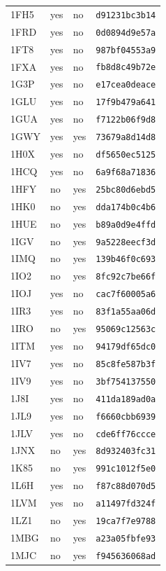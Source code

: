 \documentclass[11pt]{article}
\begin{document}
\begin{longtable}{llll}
1FH5 & yes & no & \texttt{d91231bc3b14}\\
1FRD & yes & no & \texttt{0d0894d9e57a}\\
1FT8 & yes & no & \texttt{987bf04553a9}\\
1FXA & yes & no & \texttt{fb8d8c49b72e}\\
1G3P & yes & no & \texttt{e17cea0deace}\\
1GLU & yes & no & \texttt{17f9b479a641}\\
1GUA & yes & no & \texttt{f7122b06f9d8}\\
1GWY & yes & yes & \texttt{73679a8d14d8}\\
1H0X & yes & no & \texttt{df5650ec5125}\\
1HCQ & yes & no & \texttt{6a9f68a71836}\\
1HFY & no & yes & \texttt{25bc80d6ebd5}\\
1HK0 & no & yes & \texttt{dda174b0c4b6}\\
1HUE & no & yes & \texttt{b89a0d9e4ffd}\\
1IGV & no & yes & \texttt{9a5228eecf3d}\\
1IMQ & no & yes & \texttt{139b46f0c693}\\
1IO2 & no & yes & \texttt{8fc92c7be66f}\\
1IOJ & yes & no & \texttt{cac7f60005a6}\\
1IR3 & yes & no & \texttt{83f1a55aa06d}\\
1IRO & no & yes & \texttt{95069c12563c}\\
1ITM & yes & no & \texttt{94179df65dc0}\\
1IV7 & yes & no & \texttt{85c8fe587b3f}\\
1IV9 & yes & no & \texttt{3bf754137550}\\
1J8I & yes & no & \texttt{411da189ad0a}\\
1JL9 & yes & no & \texttt{f6660cbb6939}\\
1JLV & yes & no & \texttt{cde6ff76ccce}\\
1JNX & no & yes & \texttt{8d932403fc31}\\
1K85 & no & yes & \texttt{991c1012f5e0}\\
1L6H & yes & no & \texttt{f87c88d070d5}\\
1LVM & yes & no & \texttt{a11497fd324f}\\
1LZ1 & no & yes & \texttt{19ca7f7e9788}\\
1MBG & no & yes & \texttt{a23a05fbfe93}\\
1MJC & no & yes & \texttt{f945636068ad}\\

\end{longtable}
\end{document}
